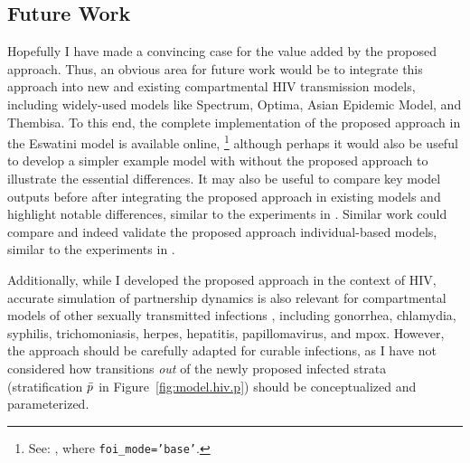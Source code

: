 \subsection{Future Work}\label{foi.disc.fw}
Hopefully I have made a convincing case for the value added by the proposed approach.
Thus, an obvious area for future work would be to integrate this approach
into new and existing compartmental HIV transmission models,
including widely-used models like Spectrum, Optima, Asian Epidemic Model, and Thembisa.
To this end, the complete implementation of the proposed approach
in the Eswatini model is available online,%
\footnote{See: ,
  where \texttt{foi_mode='base'}.}
although perhaps it would also be useful to develop a simpler example model
with \vs without the proposed approach to illustrate the essential differences.
It may also be useful to compare key model outputs
before \vs after integrating the proposed approach in existing models
and highlight notable differences, similar to the experiments in .
Similar work could compare and indeed validate the proposed approach \vs individual-based models,
similar to the experiments in \cite{Johnson2016a}.
\par
Additionally, while I developed the proposed approach in the context of HIV,
accurate simulation of partnership dynamics is also relevant for
compartmental models of other sexually transmitted infections \cite{Rao2021}, including
gonorrhea, chlamydia, syphilis, trichomoniasis, herpes, hepatitis, papillomavirus, and mpox.
However, the approach should be carefully adapted for curable infections,
as I have not considered how transitions \emph{out} of the newly proposed infected strata
(stratification $\bar{p}$ in Figure~\ref{fig:model.hiv.p}) should be conceptualized and parameterized.
